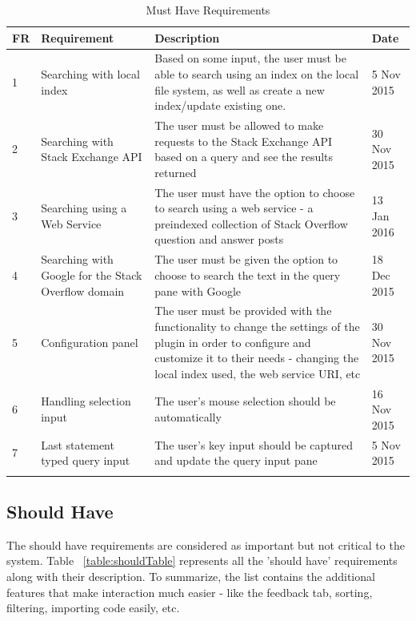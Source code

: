 \documentclass{l4proj}
\begin{document}
\begingroup
\renewcommand\arraystretch{1.5}
\begin{longtable}{p{0.5cm}p{4cm}p{9cm}p{2cm}}
\caption{Must Have Requirements}\\
\hline
FR & Requirement & Description & Date \\
\hline
1 & Searching with local index & Based on some input, the user must be able to search using an index on the local file system, as well as create a new index/update existing one. & 5 Nov 2015\\
2 & Searching with Stack Exchange API & The user must be allowed to make requests to the Stack Exchange API based on a query and see the results returned & 30 Nov 2015\\
3 & Searching using a Web Service & The user must have the option to choose to search using a web service - a preindexed collection of Stack Overflow question and answer posts & 13 Jan 2016\\
4 & Searching with Google for the Stack Overflow domain & The user must be given the option to choose to search the text in the query pane with Google & 18 Dec 2015\\
5 & Configuration panel & The user must be provided with the functionality to change the settings of the plugin in order to configure and customize it to their needs - changing the local index used, the web service URI, etc & 30 Nov 2015\\
6 & Handling selection input & The user's mouse selection should be automatically & 16 Nov 2015\\
7 & Last statement typed query input & The user's key input should be captured and update the query input pane & 5 Nov 2015\\

\hline
\label{table:mustTable}
\end{longtable}
\endgroup

\subsection{Should Have}
The should have requirements are considered as important but not critical to the system. Table ~\ref{table:shouldTable} represents all the 'should have' requirements along with their description. To summarize, the list contains the additional features that make interaction much easier - like the feedback tab, sorting, filtering, importing code easily, etc.
\end{document}
